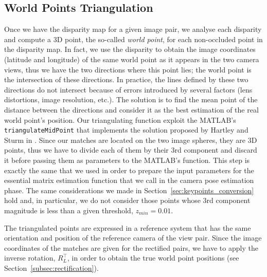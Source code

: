 \subsection{World Points Triangulation}\label{subsec:triangulation}
Once we have the disparity map for a given image pair, we analyse each
disparity and compute a 3D point, the so-called \emph{world point}, for each
non-occluded point in the disparity map.
In fact, we use the disparity to obtain the image coordinates (latitude and
longitude) of the same world point as it appears in the two camera views,
thus we have the two directions where this point lies; the world point is
the intersection of these directions.
In practice, the lines defined by these two directions do not intersect
because of errors introduced by several factors (lens
distortions, image resolution, etc.). The solution is to find the mean point of the
distance between the directions and consider it as the best estimation
of the real world point's position.
Our triangulating function exploit the MATLAB's {\tt triangulateMidPoint}
that implements the solution proposed by Hartley and Sturm in
\cite{hartley1997triangulation}. Since our matches are located on the two
image spheres, they are 3D points, thus we have to divide each of them by their
3rd component and discard it before passing them as parameters to the
MATLAB's function. This step is exactly the same that we used in order to prepare
the input parameters for the essential matrix estimation function that we
call in the camera pose estimation phase. The same considerations we made in
Section~\ref{sec:keypoints_conversion}
hold and, in particular, we do not consider those points whose
3rd component magnitude is less than a given threshold, $z_{min} = 0.01$.

The triangulated points are expressed in a reference system that has the same
orientation and position of the reference camera of the view pair.
Since the image coordinates of the matches are given for the rectified pairs,
we have to apply the inverse rotation, $R_L^\top$, in order to obtain the true
world point positions (see Section~\ref{subsec:rectification}).

